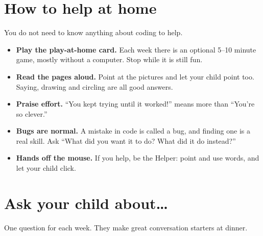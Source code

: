 \documentclass[track=junior,level=1]{kidscode}
\begin{document}
\section{How to help at home}
You do not need to know anything about coding to help.
\begin{itemize}[itemsep=3pt]
  \item \textbf{Play the play-at-home card.} Each week there is an optional 5--10 minute game, mostly
        without a computer. Stop while it is still fun.
  \item \textbf{Read the pages aloud.} Point at the pictures and let your child point too. Saying,
        drawing and circling are all good answers.
  \item \textbf{Praise effort.} \enquote{You kept trying until it worked!} means more than
        \enquote{You're so clever.}
  \item \textbf{Bugs are normal.} A mistake in code is called a bug, and finding one is a real skill.
        Ask \enquote{What did you want it to do? What did it do instead?}
  \item \textbf{Hands off the mouse.} If you help, be the Helper: point and use words, and let your child click.
\end{itemize}

\section{Ask your child about\dots}
One question for each week. They make great conversation starters at dinner.
\end{document}
